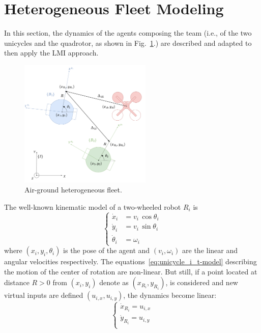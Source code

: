 \documentclass{ifacconf}
\begin{document}
\section{Heterogeneous Fleet Modeling}
\label{sec:heterogeneous_fleet_modeling}
In this section, the dynamics of the agents composing the team
(i.e., of the two unicycles and the quadrotor, as shown in Fig.~\ref{fig:airground-fleet}.)
are described and adapted to then apply the LMI approach.
\begin{figure}
    \centering
    \includegraphics[height=6.1cm]{images/heterogenous_fleet_PNG300_2.png}
    \caption{Air-ground heterogeneous fleet.}
    \label{fig:airground-fleet}
\end{figure}
The well-known kinematic model of a two-wheeled robot $R_i$ is
\begin{equation}
    \begin{cases}
        \dot{x}_i &= v_i \, \cos\theta_i \\
        \dot{y}_i &= v_i \, \sin\theta_i \\
        \dot{\theta}_i &= \omega_i
    \end{cases}
    \label{eq:unicycle_i_t-model}
\end{equation}
where $(x_i, y_i, \theta_i)$ is the pose of the agent 
and $(v_i, \omega_i)$ are the linear and
angular velocities respectively.
The equations~\eqref{eq:unicycle_i_t-model} describing the motion of the center of rotation are non-linear.
But still, if a point located at distance $R > 0$ from 
$(x_i, y_i)$ denote as $({x}_{R_i}, {y}_{R_i})$, is 
considered and new virtual inputs are defined $(u_{i,x},u_{i,y})$, 
the dynamics become linear:
\begin{equation}
    \begin{cases}
        \dot{x}_{R_i} = u_{i,x} \\
        \dot{y}_{R_i} = u_{i,y} \\
    \end{cases}
\end{equation}
\end{document}
